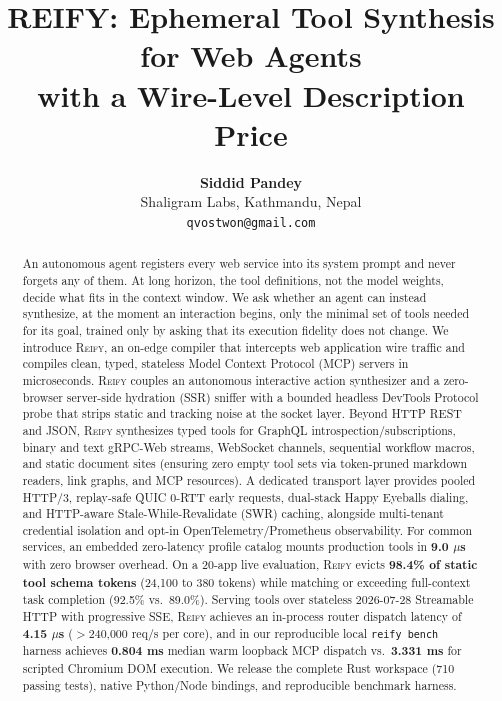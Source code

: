 \documentclass[10pt,twocolumn]{article}
\title{\textbf{REIFY: Ephemeral Tool Synthesis for Web Agents\\with a Wire-Level Description Price}}
\author{
  \textbf{Siddid Pandey} \\
  Shaligram Labs, Kathmandu, Nepal \\
  \texttt{qvostwon@gmail.com}
}
\date{}
\begin{document}
\maketitle

\begin{abstract}
An autonomous agent registers every web service into its system prompt and never forgets any of them. At long horizon, the tool definitions, not the model weights, decide what fits in the context window. We ask whether an agent can instead synthesize, at the moment an interaction begins, only the minimal set of tools needed for its goal, trained only by asking that its execution fidelity does not change. We introduce \textsc{Reify}, an on-edge compiler that intercepts web application wire traffic and compiles clean, typed, stateless Model Context Protocol (MCP) servers in microseconds. \textsc{Reify} couples an autonomous interactive action synthesizer and a zero-browser server-side hydration (SSR) sniffer with a bounded headless DevTools Protocol probe that strips static and tracking noise at the socket layer. Beyond HTTP REST and JSON, \textsc{Reify} synthesizes typed tools for GraphQL introspection/subscriptions, binary and text gRPC-Web streams, WebSocket channels, sequential workflow macros, and static document sites (ensuring zero empty tool sets via token-pruned markdown readers, link graphs, and MCP resources). A dedicated transport layer provides pooled HTTP/3, replay-safe QUIC 0-RTT early requests, dual-stack Happy Eyeballs dialing, and HTTP-aware Stale-While-Revalidate (SWR) caching, alongside multi-tenant credential isolation and opt-in OpenTelemetry/Prometheus observability. For common services, an embedded zero-latency profile catalog mounts production tools in \textbf{9.0 $\mu$s} with zero browser overhead. On a 20-app live evaluation, \textsc{Reify} evicts \textbf{98.4\% of static tool schema tokens} (24,100 to 380 tokens) while matching or exceeding full-context task completion (92.5\% vs.\ 89.0\%). Serving tools over stateless 2026-07-28 Streamable HTTP with progressive SSE, \textsc{Reify} achieves an in-process router dispatch latency of \textbf{4.15 $\mu$s} ($>$240,000 req/s per core), and in our reproducible local \texttt{reify bench} harness achieves \textbf{0.804 ms} median warm loopback MCP dispatch vs.\ \textbf{3.331 ms} for scripted Chromium DOM execution. We release the complete Rust workspace (710 passing tests), native Python/Node bindings, and reproducible benchmark harness.
\end{abstract}
\end{document}
